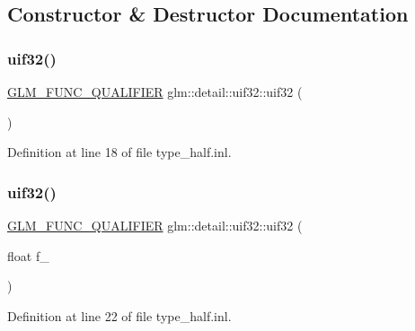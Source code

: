\subsection{Constructor \& Destructor Documentation}
\mbox{\label{unionglm_1_1detail_1_1uif32_a185c257ac32e21727191ba7e52d97e3e}} 
\subsubsection{\texorpdfstring{uif32()}{uif32()}\hspace{0.1cm}{\footnotesize\ttfamily [1/3]}}
{\footnotesize\ttfamily \mbox{\hyperlink{setup_8hpp_a33fdea6f91c5f834105f7415e2a64407}{G\+L\+M\+\_\+\+F\+U\+N\+C\+\_\+\+Q\+U\+A\+L\+I\+F\+I\+ER}} glm\+::detail\+::uif32\+::uif32 (\begin{DoxyParamCaption}{ }\end{DoxyParamCaption})\hspace{0.3cm}{\ttfamily [inline]}}



Definition at line 18 of file type\+\_\+half.\+inl.

\mbox{\label{unionglm_1_1detail_1_1uif32_a0d6e08c93b3d52c01e45864ff689c426}} 
\subsubsection{\texorpdfstring{uif32()}{uif32()}\hspace{0.1cm}{\footnotesize\ttfamily [2/3]}}
{\footnotesize\ttfamily \mbox{\hyperlink{setup_8hpp_a33fdea6f91c5f834105f7415e2a64407}{G\+L\+M\+\_\+\+F\+U\+N\+C\+\_\+\+Q\+U\+A\+L\+I\+F\+I\+ER}} glm\+::detail\+::uif32\+::uif32 (\begin{DoxyParamCaption}\item[{float}]{f\+\_\+ }\end{DoxyParamCaption})\hspace{0.3cm}{\ttfamily [inline]}}



Definition at line 22 of file type\+\_\+half.\+inl.

\mbox{\label{unionglm_1_1detail_1_1uif32_aee424b46f48baa812572c015ec8bf434}} 
